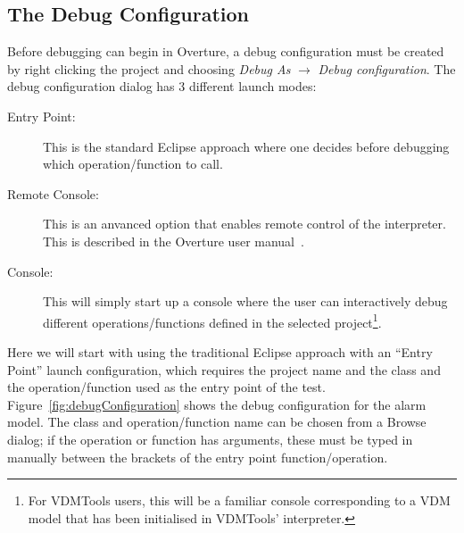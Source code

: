 \subsection{The Debug Configuration}\label{sec:debugconfig}
Before debugging can begin in Overture, a debug configuration must be created by right clicking the project and choosing \emph{Debug As} $ \rightarrow $ \emph{Debug configuration}.
The debug configuration dialog has 3 different launch modes:
%
\begin{description}
\item[Entry Point:] This is the standard Eclipse approach where one decides before debugging which operation/function to call.
\item[Remote Console:] This is an anvanced option that enables remote control of the interpreter.  This is described in the Overture user manual~\cite{Larsen&10d}.
\item[Console:] This will simply start up a console where the user can interactively debug different operations/functions defined in the selected project\footnote{For VDMTools users, this will be a familiar console corresponding to a VDM model that has been initialised in VDMTools' interpreter.}.
\end{description}
%
Here we will start with using the traditional Eclipse approach with an ``Entry Point'' launch
configuration, which requires the project name and the class and the operation/function used as the entry point of the test.  Figure~\ref{fig:debugConfiguration} shows the debug configuration for the alarm model. The class and operation/function name can be chosen from a Browse dialog; if the operation or function has arguments, these must be typed in manually between the brackets of the entry point function/operation.
%
